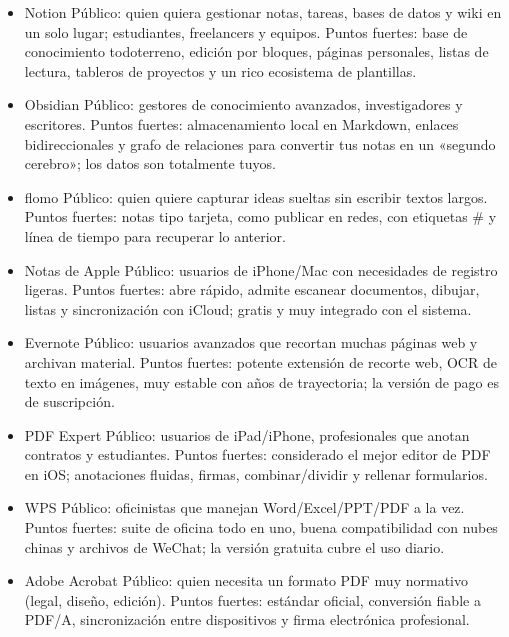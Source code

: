 \begin{itemize}
  \item Notion Público: quien quiera gestionar notas, tareas, bases de datos y wiki en un solo lugar; estudiantes, freelancers y equipos. Puntos fuertes: base de conocimiento todoterreno, edición por bloques, páginas personales, listas de lectura, tableros de proyectos y un rico ecosistema de plantillas.
  \item Obsidian Público: gestores de conocimiento avanzados, investigadores y escritores. Puntos fuertes: almacenamiento local en Markdown, enlaces bidireccionales y grafo de relaciones para convertir tus notas en un «segundo cerebro»; los datos son totalmente tuyos.
  \item flomo Público: quien quiere capturar ideas sueltas sin escribir textos largos. Puntos fuertes: notas tipo tarjeta, como publicar en redes, con etiquetas \# y línea de tiempo para recuperar lo anterior.
  \item Notas de Apple Público: usuarios de iPhone/Mac con necesidades de registro ligeras. Puntos fuertes: abre rápido, admite escanear documentos, dibujar, listas y sincronización con iCloud; gratis y muy integrado con el sistema.
  \item Evernote Público: usuarios avanzados que recortan muchas páginas web y archivan material. Puntos fuertes: potente extensión de recorte web, OCR de texto en imágenes, muy estable con años de trayectoria; la versión de pago es de suscripción.
\end{itemize}


\begin{itemize}
  \item PDF Expert Público: usuarios de iPad/iPhone, profesionales que anotan contratos y estudiantes. Puntos fuertes: considerado el mejor editor de PDF en iOS; anotaciones fluidas, firmas, combinar/dividir y rellenar formularios.
  \item WPS Público: oficinistas que manejan Word/Excel/PPT/PDF a la vez. Puntos fuertes: suite de oficina todo en uno, buena compatibilidad con nubes chinas y archivos de WeChat; la versión gratuita cubre el uso diario.
  \item Adobe Acrobat Público: quien necesita un formato PDF muy normativo (legal, diseño, edición). Puntos fuertes: estándar oficial, conversión fiable a PDF/A, sincronización entre dispositivos y firma electrónica profesional.
\end{itemize}

